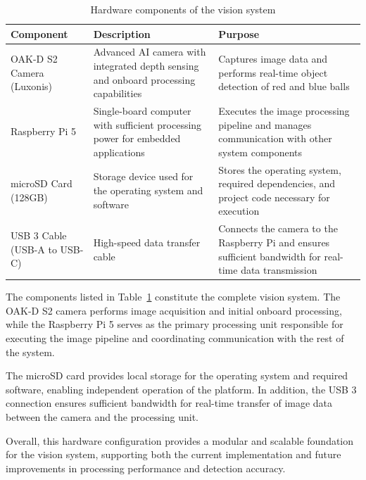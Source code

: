 \begin{table}[htbp]
    \centering
    \renewcommand{\arraystretch}{1.3}
    \begin{tabular}{|p{2.3in}|p{2.1in}|p{2.1in}|}
        \hline
        \textbf{Component} & \textbf{Description} & \textbf{Purpose} \\
        \hline
        OAK-D S2 Camera (Luxonis) & 
        Advanced AI camera with integrated depth sensing and onboard processing capabilities &
        Captures image data and performs real-time object detection of red and blue balls \\
        \hline
        Raspberry Pi 5 & 
        Single-board computer with sufficient processing power for embedded applications &
        Executes the image processing pipeline and manages communication with other system components \\
        \hline
        microSD Card (128GB) & 
        Storage device used for the operating system and software &
        Stores the operating system, required dependencies, and project code necessary for execution \\
        \hline
        USB 3 Cable (USB-A to USB-C) & 
        High-speed data transfer cable &
        Connects the camera to the Raspberry Pi and ensures sufficient bandwidth for real-time data transmission \\
        \hline
    \end{tabular}
    \caption{Hardware components of the vision system}
    \label{tab:vision_hardware}
\end{table}

The components listed in Table~\ref{tab:vision_hardware} constitute the complete vision system. The OAK-D S2 camera performs image acquisition and initial onboard processing, while the Raspberry Pi 5 serves as the primary processing unit responsible for executing the image pipeline and coordinating communication with the rest of the system.

The microSD card provides local storage for the operating system and required software, enabling independent operation of the platform. In addition, the USB 3 connection ensures sufficient bandwidth for real-time transfer of image data between the camera and the processing unit.

Overall, this hardware configuration provides a modular and scalable foundation for the vision system, supporting both the current implementation and future improvements in processing performance and detection accuracy.



